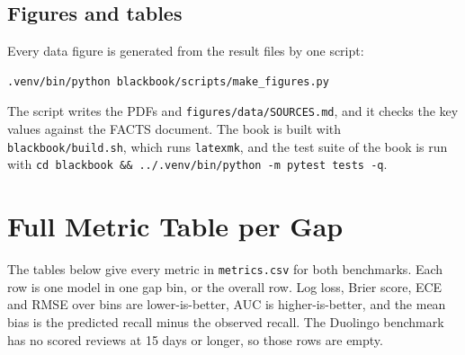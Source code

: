 \section{Figures and tables}

Every data figure is generated from the result files by one script:

\begingroup\footnotesize\begin{verbatim}
.venv/bin/python blackbook/scripts/make_figures.py
\end{verbatim}
\endgroup

The script writes the PDFs and \texttt{figures/data/SOURCES.md}, and it checks the key values against the FACTS
document. The book is built with \texttt{blackbook/build.sh}, which runs \texttt{latexmk}, and the test suite of the
book is run with \texttt{cd blackbook \&\& ../.venv/bin/python -m pytest tests -q}.

\chapter{Full Metric Table per Gap}
\label{app:metrics}

The tables below give every metric in \texttt{metrics.csv} for both benchmarks. Each row is one model in one gap bin, or the
overall row. Log loss, Brier score, ECE and RMSE over bins are lower-is-better, AUC is higher-is-better, and the mean bias
is the predicted recall minus the observed recall. The Duolingo benchmark has no scored reviews at 15 days or
longer, so those rows are empty.

